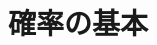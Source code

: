 \documentclass[../../topic_statistics]{subfiles}
\begin{document}
\chapter{確率の基本}



\end{document}
